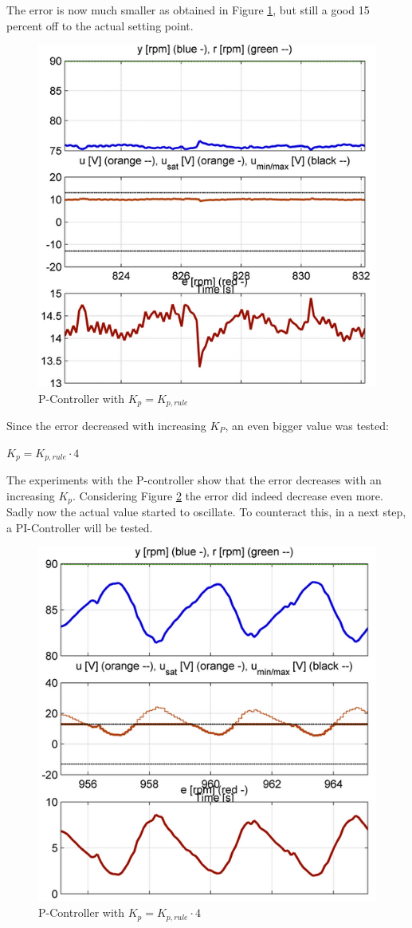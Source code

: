 The error is now much smaller as obtained in Figure \ref{fig:p_controller1}, but still a good 15 percent off to the actual setting point.

\begin{figure}[H]
\begin{center}
\includegraphics[width=0.5\linewidth]{images/general/P/p_controller1}
\end{center}
\caption{P-Controller with $ K_{p}= K_{p,rule}$}
\label{fig:p_controller1}
\end{figure}

Since the error decreased with increasing $K_P$, an even bigger value was tested:

\begin{center}
{$K_{p}= K_{p,rule}\cdot4$}
\end{center}

The experiments with the P-controller show that the error decreases with an increasing $K_{p}$.
Considering Figure \ref{fig:p_controller4} the error did indeed decrease even more. Sadly now the actual value started to oscillate. To counteract this, in a next step, a PI-Controller will be tested.

\begin{figure}[H]
\begin{center}
\includegraphics[width=0.5\linewidth]{images/general/P/p_controller4}
\end{center}
\caption{P-Controller with $ K_{p}= K_{p,rule}\cdot{4}$}
\label{fig:p_controller4}
\end{figure}
\clearpage

